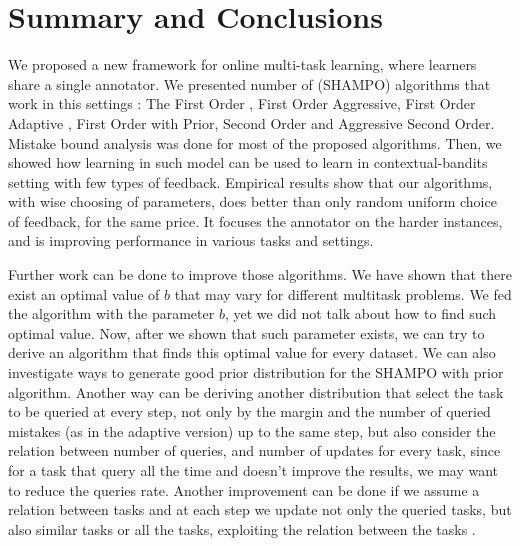 \chapter{Summary and Conclusions}
We proposed a new framework for online multi-task learning, where  learners share a single annotator. 
We presented number of (SHAMPO) algorithms that work in this settings : The First Order , First Order Aggressive, 
First Order Adaptive , First Order with Prior,  Second Order and Aggressive Second Order. 
Mistake bound analysis was done for most of the proposed algorithms. 
Then, we showed how learning in such model can be used to learn in contextual-bandits setting 
with few types of feedback. Empirical results show that our algorithms, with wise choosing of parameters, 
does better than only random uniform choice of feedback, for the same price. 
It focuses the annotator on the harder instances, and is improving performance in various tasks and settings. 

Further work can be done  to improve those algorithms. We have shown that there exist an optimal value of 
$b$ that may vary for different multitask problems. We fed the algorithm with the parameter $b$, yet we did 
not talk about how to find such optimal value. Now, after we shown that such parameter exists, 
we can try to derive an algorithm that finds this optimal value for every dataset.  
We can also investigate ways to generate good prior distribution for the SHAMPO with prior algorithm. 
Another way can be deriving another distribution that select the task to be queried at every step,
 not only by the margin and the 
number of queried mistakes (as in the adaptive version) up to the same step, but also consider the  relation 
between number of queries, and number of updates for every task, since for a task that query all the time
and doesn't improve the results, we may want to reduce the queries rate. 
Another improvement can be done if we assume a relation between tasks and at each step we update not 
only the queried tasks, but also similar tasks or all the tasks, exploiting the relation between the tasks .

